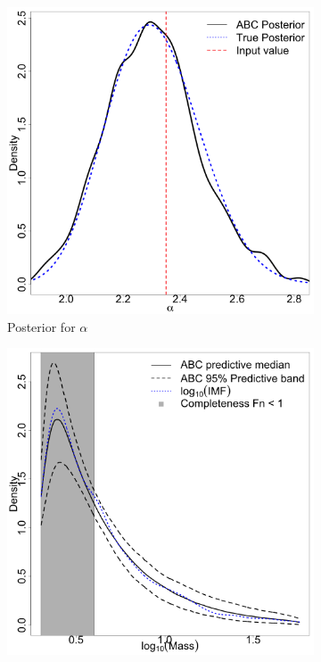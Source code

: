 \documentclass[12pt]{article}
\begin{document}
\begin{figure}[htbp]
\begin{subfigure}{0.32\textwidth}
\centering
\includegraphics[width=\textwidth]{figures/basic_1_1000_alpha.png}
\caption{Posterior for $\alpha$}\label{subfig:basic_alpha}
\end{subfigure}
\begin{subfigure}{0.32\textwidth}
\centering
\includegraphics[width=\textwidth]{figures/basic_1_1000_predictive_imf.png}

\end{subfigure}
\end{figure}
\end{document}
